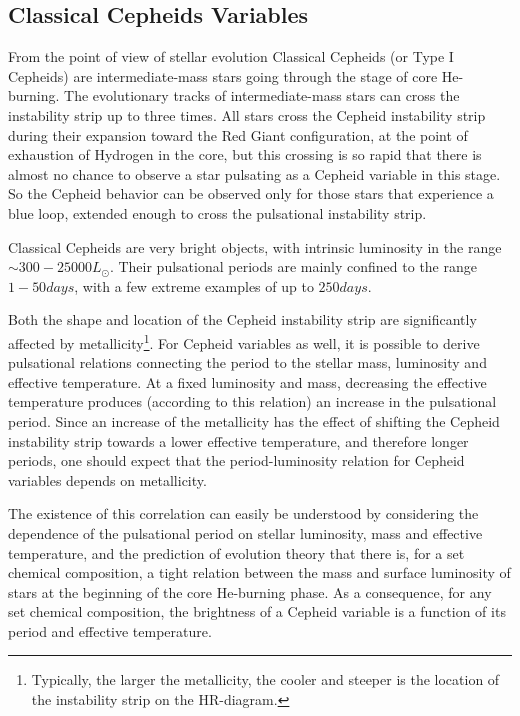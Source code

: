 \subsection{Classical Cepheids Variables}

From the point of view of stellar evolution Classical Cepheids (or Type I Cepheids) are intermediate-mass stars going through the stage of core He-burning. The evolutionary tracks of intermediate-mass stars can cross the instability strip up to three times. All stars cross the Cepheid instability strip during their expansion toward the Red Giant configuration, at the point of exhaustion of Hydrogen in the core, but this crossing is so rapid that there is almost no chance to observe a star pulsating as a Cepheid variable in this stage. So the Cepheid behavior can be observed only for those stars that experience a blue loop, extended enough to cross the pulsational instability strip.
\par Classical Cepheids are very bright objects, with intrinsic luminosity in the range $\sim 300-25000 L_{\odot}$. Their pulsational periods are mainly confined to the range $1-50\unit{days}$, with a few extreme examples of up to $250\unit{days}$.
\par Both the shape and location of the Cepheid instability strip are significantly affected by metallicity\footnote{Typically, the larger the metallicity, the cooler and steeper is the location of the instability strip on the HR-diagram.}. For Cepheid variables as well, it is possible to derive pulsational relations connecting the period to the stellar mass, luminosity and effective temperature. At a fixed luminosity and mass, decreasing the effective temperature produces (according to this relation) an increase in the pulsational period. Since an increase of the metallicity has the effect of shifting the Cepheid instability strip towards a lower effective temperature, and therefore longer periods, one should expect that the period-luminosity relation for Cepheid variables depends on metallicity.
\par The existence of this correlation can easily be understood by considering the dependence of the pulsational period on stellar luminosity, mass and effective temperature, and the prediction of evolution theory that there is, for a set chemical composition, a tight relation between the mass and surface luminosity of stars at the beginning of the core He-burning phase. As a consequence, for any set chemical composition, the brightness of a Cepheid variable is a function of its period and effective temperature.

